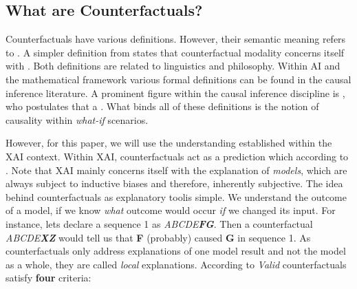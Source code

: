 \documentclass[./../../paper.tex]{subfiles}
\begin{document}
\subsection{What are Counterfactuals?}
Counterfactuals have various definitions. However, their semantic meaning refers to \autocite{_counterfactual_}. A simpler definition from \citeauthor{starr_Counterfactuals_2021} states that counterfactual modality concerns itself with .
Both definitions are related to linguistics and philosophy. Within AI and the mathematical framework various formal definitions can be found in the causal inference\autocite{hitchcock_CausalModels_2020} literature. A prominent figure within the causal inference discipline is \citeauthor{pearl_Causalinferencestatistics_2016}, who postulates that a \autocite{pearl_Causalinferencestatistics_2016}. What binds all of these definitions is the notion of causality within \emph{what-if} scenarios.

However, for this paper, we will use the understanding established within the \gls{XAI} context. Within \gls{XAI}, counterfactuals act as a prediction which  according to \citeauthor{molnar2019}\autocite[p. 212]{molnar2019}. Note that \gls{XAI} mainly concerns itself with the explanation of \emph{models}, which are always subject to inductive biases and therefore, inherently subjective. The idea behind counterfactuals as explanatory tool\footnotemark is simple. We understand the outcome of a model, if we know \emph{what} outcome would occur \emph{if} we changed its input. For instance, lets declare a sequence 1 as \textit{ABCDE\textbf{FG}}. Then a counterfactual \textit{ABCDE\textbf{XZ}} would tell us that \textbf{F} (probably) caused \textbf{G} in sequence 1. As counterfactuals only address explanations of one model result and not the model as a whole, they are called \emph{local} explanations\autocite[p. 212]{molnar2019}. According to \citeauthor{molnar2019} \emph{Valid} counterfactuals satisfy \textbf{four} criteria\autocite[p. 212]{molnar2019}:
\end{document}
